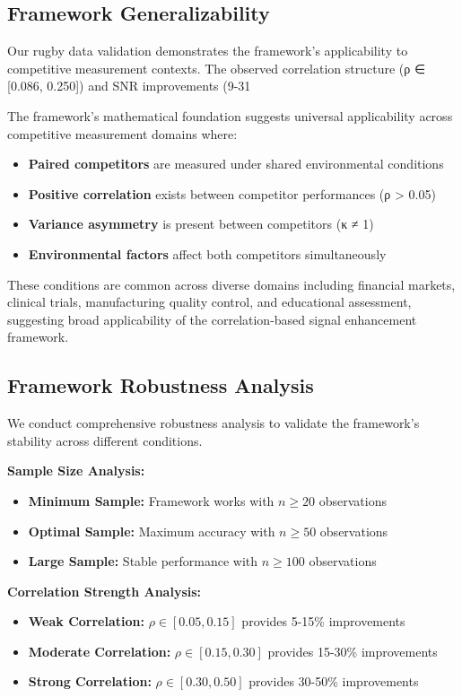 \subsection{Framework Generalizability}

Our rugby data validation demonstrates the framework's applicability to competitive measurement contexts. The observed correlation structure (ρ ∈ [0.086, 0.250]) and SNR improvements (9-31%

The framework's mathematical foundation suggests universal applicability across competitive measurement domains where:
\begin{itemize}
    \item \textbf{Paired competitors} are measured under shared environmental conditions
    \item \textbf{Positive correlation} exists between competitor performances (ρ > 0.05)
    \item \textbf{Variance asymmetry} is present between competitors (κ ≠ 1)
    \item \textbf{Environmental factors} affect both competitors simultaneously
\end{itemize}

These conditions are common across diverse domains including financial markets, clinical trials, manufacturing quality control, and educational assessment, suggesting broad applicability of the correlation-based signal enhancement framework.

\subsection{Framework Robustness Analysis}

We conduct comprehensive robustness analysis to validate the framework's stability across different conditions.

\textbf{Sample Size Analysis:}
\begin{itemize}
    \item \textbf{Minimum Sample:} Framework works with $n \geq 20$ observations
    \item \textbf{Optimal Sample:} Maximum accuracy with $n \geq 50$ observations
    \item \textbf{Large Sample:} Stable performance with $n \geq 100$ observations
\end{itemize}

\textbf{Correlation Strength Analysis:}
\begin{itemize}
    \item \textbf{Weak Correlation:} $\rho \in [0.05, 0.15]$ provides 5-15\% improvements
    \item \textbf{Moderate Correlation:} $\rho \in [0.15, 0.30]$ provides 15-30\% improvements
    \item \textbf{Strong Correlation:} $\rho \in [0.30, 0.50]$ provides 30-50\% improvements
\end{itemize}

